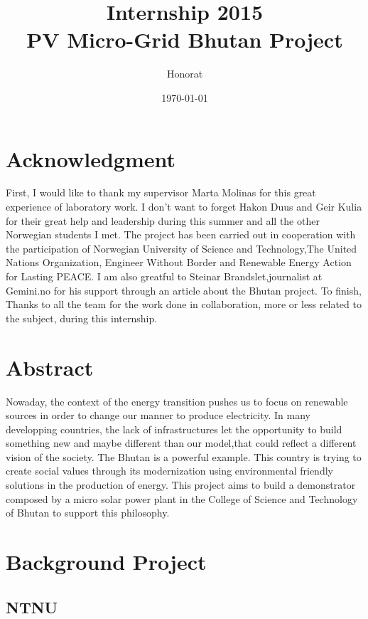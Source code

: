 \documentclass{article}
\title{Internship 2015\\ PV Micro-Grid Bhutan Project}
\author{Honorat \bsc{Quinard (SEM3A)}}
\date{\today}
\begin{document}
\maketitle
\tableofcontents
\newpage
\section*{Acknowledgment}

First, I would like to thank my supervisor Marta Molinas for this great experience of laboratory work. 
I don't want to forget Hakon Duus and Geir Kulia for their great help and leadership during this summer and all the other Norwegian students I met.
The project has been carried out in cooperation with the participation of  Norwegian University of Science and Technology,The United Nations Organization, Engineer Without Border and Renewable Energy Action for Lasting PEACE. 
I am also greatful to Steinar Brandslet,journalist at Gemini.no for his support through an article about the Bhutan project.
To finish, Thanks to all the team for the work done in collaboration, more or less related to the subject, during this internship.

\section*{Abstract}

Nowaday, the context of the energy transition pushes us to focus on renewable sources in order to change our manner to produce electricity.
In many developping countries, the lack of infrastructures let the opportunity to build something new and maybe different than our model,that could reflect a different vision of the society. 
The Bhutan is a powerful example. This country is trying to create social values through its modernization using environmental friendly solutions in the production of energy.
This project aims to build a demonstrator composed by a micro solar power plant in the College of Science and Technology of Bhutan to support this philosophy.

\section{Background Project}

\subsection{NTNU}
\end{document}
